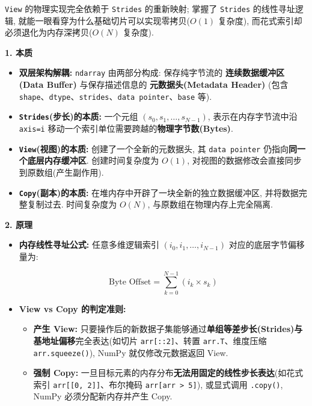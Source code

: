 \documentclass[11pt]{article}
\providecommand{\tightlist}{%
      \setlength{\itemsep}{0pt}\setlength{\parskip}{0pt}}
\begin{document}
\texttt{View} 的物理实现完全依赖于 \texttt{Strides} 的重新映射; 掌握了
\texttt{Strides} 的线性寻址逻辑,
就能一眼看穿为什么基础切片可以实现零拷贝(\(O(1)\) 复杂度),
而花式索引却必须退化为内存深拷贝(\(O(N)\) 复杂度).

\textbf{1. 本质}

\begin{itemize}
\tightlist
\item
  \textbf{双层架构解耦:} \texttt{ndarray} 由两部分构成: 保存纯字节流的
  \textbf{连续数据缓冲区(Data Buffer)} 与保存描述信息的
  \textbf{元数据头(Metadata Header)} (包含
  \texttt{shape}、\texttt{dtype}、\texttt{strides}、\texttt{data\ pointer}、\texttt{base}
  等).
\item
  \textbf{\texttt{Strides}(步长)的本质:} 一个元组
  \((s_0, s_1, \dots, s_{N-1})\), 表示在内存字节流中沿 \texttt{axis=i}
  移动一个索引单位需要跨越的\textbf{物理字节数(Bytes)}.
\item
  \textbf{\texttt{View}(视图)的本质:} 创建了一个全新的元数据头, 其
  \texttt{data\ pointer} 仍指向\textbf{同一个底层内存缓冲区}.
  创建时间复杂度为 \(O(1)\),
  对视图的数据修改会直接同步到原数组(产生副作用).
\item
  \textbf{\texttt{Copy}(副本)的本质:}
  在堆内存中开辟了一块全新的独立数据缓冲区, 并将数据完整复制过去.
  时间复杂度为 \(O(N)\), 与原数组在物理内存上完全隔离.
\end{itemize}

\textbf{2. 原理}

\begin{itemize}
\item
  \textbf{内存线性寻址公式:} 任意多维逻辑索引
  \((i_0, i_1, \dots, i_{N-1})\) 对应的底层字节偏移量为:

  \[\text{Byte Offset} = \sum_{k=0}^{N-1} (i_k \times s_k)\]
\item
  \textbf{View vs Copy 的判定准则:}

  \begin{itemize}
  \tightlist
  \item
    \textbf{产生 View:}
    只要操作后的新数据子集能够通过\textbf{单组等差步长(Strides)与基地址偏移}完全表达(如切片
    \texttt{arr{[}::2{]}}、转置 \texttt{arr.T}、维度压缩
    \texttt{arr.squeeze()}), NumPy 就仅修改元数据返回 View.
  \item
    \textbf{强制 Copy:}
    一旦目标元素的内存分布\textbf{无法用固定的线性步长表达}(如花式索引
    \texttt{arr{[}{[}0,\ 2{]}{]}}、布尔掩码
    \texttt{arr{[}arr\ \textgreater{}\ 5{]}}), 或显式调用
    \texttt{.copy()}, NumPy 必须分配新内存并产生 Copy.
  \end{itemize}
\end{itemize}
\end{document}
